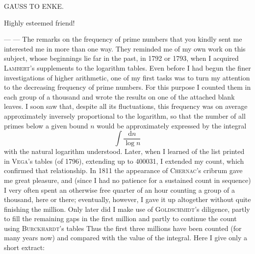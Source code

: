\clearpage
{}%
\renewcommand{\BookRunningTitle}{Gauss to Enke}
\begingroup
\begin{center}{\large GAUSS TO ENKE.}\end{center}
\begin{center}Highly esteemed friend!\end{center}

— — The remarks on the frequency of prime numbers that you kindly sent me interested me in more than one way. They reminded me of my own work on this subject, whose beginnings lie far in the past, in 1792 or 1793, when I acquired \textsc{Lambert}’s supplements to the logarithm tables. Even before I had begun the finer investigations of higher arithmetic, one of my first tasks was to turn my attention to the decreasing frequency of prime numbers. For this purpose I counted them in each group of a thousand and wrote the results on one of the attached blank leaves. I soon saw that, despite all its fluctuations, this frequency was on average approximately inversely proportional to the logarithm, so that the number of all primes below a given bound $n$ would be approximately expressed by the integral
\[
\int\frac{\mathrm{d}n}{\log n}
\]
with the natural logarithm understood. Later, when I learned of the list printed in \textsc{Vega}’s tables (of 1796), extending up to 400031, I extended my count, which confirmed that relationship. In 1811 the appearance of \textsc{Chernac}’s
%
cribrum gave me great pleasure, and (since I had no patience for a sustained count in sequence) I very often spent an otherwise free quarter of an hour counting a group of a thousand, here or there; eventually, however, I gave it up altogether without quite finishing the million. Only later did I make use of \textsc{Goldschmidt}’s diligence, partly to fill the remaining gaps in the first million and partly to continue the count using \textsc{Burck\-hardt}’s tables Thus the first three millions have been counted (for many years now) and compared with the value of the integral. Here I give only a short extract:

